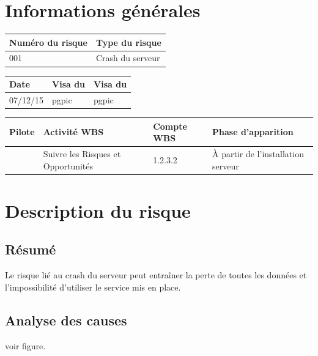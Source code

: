 \section*{Informations générales}
 
\begin{table}[H]
\centering
	\begin{tabularx}{16.8cm}{|X|X|}
	\hline
	\rowcolor{gray!40} Numéro du risque & Type du risque \\
	\hline
	001 & Crash du serveur \\
	\hline
	\end{tabularx}
\end{table}

\begin{table}[H]
\centering
	\begin{tabularx}{16.8cm}{|X|X|X|}
	\hline
	\rowcolor{gray!40} Date & Visa du \RQ & Visa du \CP \\
	\hline
	 07/12/15 & pgpic & pgpic \\
	\hline
	\end{tabularx}
\end{table}

\begin{table}[H]
\centering
	\begin{tabularx}{16.8cm}{|X|X|X|X|}
	\hline
	\rowcolor{gray!40} Pilote & Activité WBS & Compte WBS & Phase d'apparition \\
	\hline
	 \Matthieu & Suivre les Risques et Opportunités & 1.2.3.2 & À partir de l’installation serveur\\
	\hline
	\end{tabularx}
\end{table}

\section*{Description du risque}

\subsection*{Résumé}
	Le risque lié au crash du serveur peut entraîner la perte de toutes les données et l'impossibilité d'utiliser le service mis en place.
	
\subsection*{Analyse des causes}
	voir figure.


